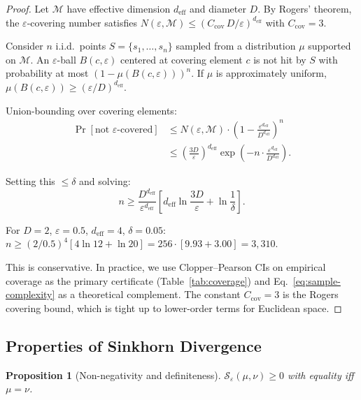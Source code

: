 \documentclass[10pt]{article}
\newtheorem{proposition}[theorem]{Proposition}
\begin{document}
\begin{proof}
Let $\mathcal{M}$ have effective dimension $d_{\mathrm{eff}}$ and diameter $D$.
By Rogers' theorem, the $\varepsilon$-covering number satisfies
$N(\varepsilon, \mathcal{M}) \leq (C_{\mathrm{cov}}\, D / \varepsilon)^{d_{\mathrm{eff}}}$
with $C_{\mathrm{cov}} = 3$.

Consider $n$ i.i.d.\ points $S = \{s_1, \ldots, s_n\}$ sampled from a distribution $\mu$ supported on $\mathcal{M}$.
An $\varepsilon$-ball $B(c, \varepsilon)$ centered at covering element $c$ is not hit by $S$ with probability at most $(1 - \mu(B(c,\varepsilon)))^n$.
If $\mu$ is approximately uniform, $\mu(B(c,\varepsilon)) \geq (\varepsilon/D)^{d_{\mathrm{eff}}}$.

Union-bounding over covering elements:
\begin{align}
\Pr[\text{not } \varepsilon\text{-covered}]
&\leq N(\varepsilon, \mathcal{M}) \cdot \left(1 - \frac{\varepsilon^{d_{\mathrm{eff}}}}{D^{d_{\mathrm{eff}}}}\right)^n \\
&\leq \left(\frac{3D}{\varepsilon}\right)^{d_{\mathrm{eff}}} \exp\!\left(-n \cdot \frac{\varepsilon^{d_{\mathrm{eff}}}}{D^{d_{\mathrm{eff}}}}\right).
\end{align}

Setting this $\leq \delta$ and solving:
\begin{equation}
n \geq \frac{D^{d_{\mathrm{eff}}}}{\varepsilon^{d_{\mathrm{eff}}}} \left[d_{\mathrm{eff}} \ln\frac{3D}{\varepsilon} + \ln\frac{1}{\delta}\right].
\end{equation}

For $D = 2$, $\varepsilon = 0.5$, $d_{\mathrm{eff}} = 4$, $\delta = 0.05$:
$n \geq (2/0.5)^4 [4 \ln 12 + \ln 20] = 256 \cdot [9.93 + 3.00] = 3{,}310$.

This is conservative.
In practice, we use Clopper--Pearson CIs on empirical coverage as the primary certificate (Table~\ref{tab:coverage}) and Eq.~\eqref{eq:sample-complexity} as a theoretical complement.
The constant $C_{\mathrm{cov}} = 3$ is the Rogers covering bound, which is tight up to lower-order terms for Euclidean space.
\end{proof}

\subsection{Properties of Sinkhorn Divergence}

\begin{proposition}[Non-negativity and definiteness]
$\mathcal{S}_\varepsilon(\mu, \nu) \geq 0$ with equality iff $\mu = \nu$.
\end{proposition}
\end{document}
